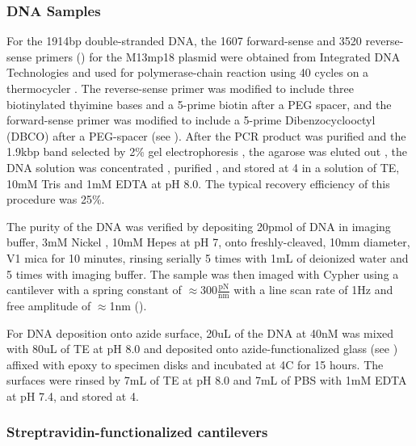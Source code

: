 \subsubsection{DNA Samples}

\firstp For the 1914bp double-stranded DNA, the 1607 forward-sense and 3520 reverse-sense primers () for the M13mp18 plasmid  were obtained from Integrated DNA Technologies  and used for polymerase-chain reaction  using 40 cycles on a thermocycler . The reverse-sense primer was modified to include three biotinylated thyimine bases and a 5-prime biotin after a PEG spacer, and the forward-sense primer was modified to include a 5-prime Dibenzocyclooctyl (DBCO) after a PEG-spacer (see ). After the PCR product was purified  and the 1.9kbp band selected by 2\% gel electrophoresis , the agarose was eluted out , the DNA solution was concentrated , purified , and stored at 4\degreeC{} in a solution of TE, 10mM Tris  and 1mM EDTA  at pH 8.0. The typical recovery efficiency of this procedure was 25\%. \pl

The purity of the DNA was verified by depositing 20pmol of DNA in imaging buffer, 3mM Nickel , 10mM Hepes  at pH 7, onto freshly-cleaved, 10mm diameter, V1 mica  for 10 minutes, rinsing serially 5 times with 1mL of deionized water and 5 times with imaging buffer. The sample was then imaged with Cypher using a cantilever with a spring constant of $\approx 300 \frac{\text{pN}}{\text{nm}}$  with a line scan rate of 1Hz and free amplitude of $\approx$1nm ().\pl 

For DNA deposition onto azide surface, 20uL of the DNA at 40nM was mixed with 80uL of TE at pH 8.0 and deposited onto azide-functionalized glass (see ) affixed with epoxy  to specimen disks  and incubated at 4C for 15 hours. The surfaces were rinsed by 7mL of TE at pH 8.0 and 7mL of PBS with 1mM EDTA at pH 7.4, and stored at 4\degreeC{}. 

\subsubsection{Streptravidin-functionalized cantilevers}

